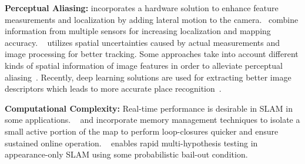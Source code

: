 \textbf{Perceptual Aliasing:} %
\cite{cam-oscillations} incorporates a hardware solution to enhance feature measurements and localization by adding lateral motion to the camera.~\cite{sens-fus-2,sens-fus-3} combine information from multiple sensors for increasing localization and mapping accuracy.
~\cite{feature_spatial_1} utilizes spatial uncertainties caused by actual measurements and image processing for better tracking.
Some approaches take into account different kinds of spatial information of image features in order to alleviate perceptual aliasing~\cite{feature_spatial_3}. %
Recently, deep learning solutions are used for extracting better image descriptors which leads to more accurate place recognition~\cite{perceptual_aliasing1}.

\textbf{Computational Complexity:} Real-time performance is desirable in SLAM in some applications.
~\cite{memory_management2} and \cite{memory_management} incorporate memory management techniques to isolate a small active portion of the map to perform loop-closures quicker and ensure sustained online operation.
~\cite{computational_complexity1} enables rapid multi-hypothesis testing in appearance-only SLAM using some probabilistic bail-out condition.

